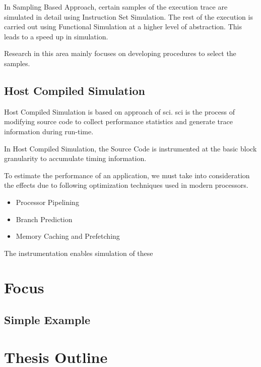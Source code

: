 In Sampling Based Approach, certain samples of the execution trace are simulated in detail using Instruction Set Simulation. The rest of the execution is carried out using Functional Simulation at a higher level of abstraction. This leads to a speed up in simulation.

Research in this area mainly focuses on developing procedures to select the samples.


\subsection{Host Compiled Simulation}
Host Compiled Simulation is based on approach of \gls{sci}. \gls{sci} is the process of modifying source code to collect performance statistics and generate trace information during run-time. 

In Host Compiled Simulation, the Source Code is instrumented at the basic block granularity to accumulate timing information.

To estimate the performance of an application, we must take into consideration the effects due to following optimization techniques used in modern processors.
\begin{itemize} \itemsep -8pt
\item Processor Pipelining
\item Branch Prediction
\item Memory Caching and Prefetching
\end{itemize}
The instrumentation enables simulation of these

\section{Focus}

\subsection{Simple Example}

\section{Thesis Outline}